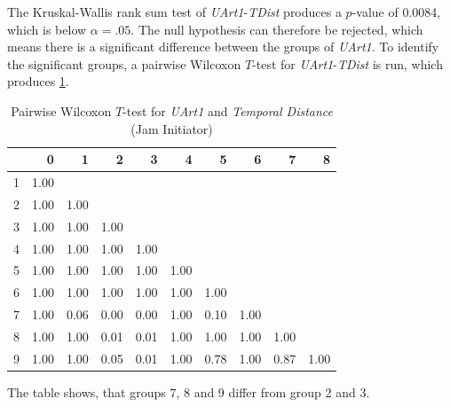 The Kruskal-Wallis rank sum test of \textit{UArt1}-\textit{TDist} produces a $p$-value of 0.0084, which is below $\alpha=.05$. The null hypothesis can therefore be rejected, which means there is a significant difference between the groups of \textit{UArt1}. To identify the significant groups, a pairwise Wilcoxon $T$-test for \textit{UArt1}-\textit{TDist} is run, which produces \cref{tbl:wilcoxon_baysis_initiator_UArt_TDist}. 
\begin{table}[ht]
	\tiny
	\centering
    \begin{tabular}{rrrrrrrrrr}
        \toprule
        & 0 & 1 & 2 & 3 & 4 & 5 & 6 & 7 & 8 \\ 
        \midrule
        1 & 1.00 &  &  &  &  &  &  &  &  \\ 
        2 & 1.00 & 1.00 &  &  &  &  &  &  &  \\ 
        3 & 1.00 & 1.00 & 1.00 &  &  &  &  &  &  \\ 
        4 & 1.00 & 1.00 & 1.00 & 1.00 &  &  &  &  &  \\ 
        5 & 1.00 & 1.00 & 1.00 & 1.00 & 1.00 &  &  &  &  \\ 
        6 & 1.00 & 1.00 & 1.00 & 1.00 & 1.00 & 1.00 &  &  &  \\ 
        7 & 1.00 & 0.06 & 0.00 & 0.00 & 1.00 & 0.10 & 1.00 &  &  \\ 
        8 & 1.00 & 1.00 & 0.01 & 0.01 & 1.00 & 1.00 & 1.00 & 1.00 &  \\ 
        9 & 1.00 & 1.00 & 0.05 & 0.01 & 1.00 & 0.78 & 1.00 & 0.87 & 1.00 \\ 
        \bottomrule
      \end{tabular}
    \caption{Pairwise Wilcoxon $T$-test for \textit{UArt1} and \textit{Temporal Distance} (Jam Initiator)}
    \label{tbl:wilcoxon_baysis_initiator_UArt_TDist}
\end{table}
The table shows, that groups 7, 8 and 9 differ from group 2 and 3.
